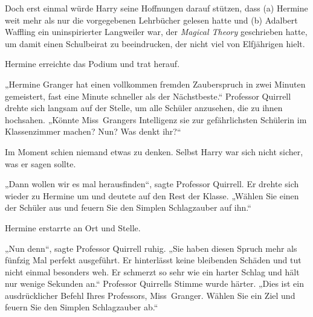 Doch erst einmal würde Harry seine Hoffnungen darauf stützen, dass (a) Hermine weit mehr als nur die vorgegebenen Lehrbücher gelesen hatte und (b) Adalbert Waffling ein uninspirierter Langweiler war, der \emph{Magical Theory} geschrieben hatte, um damit einen Schulbeirat zu beeindrucken, der nicht viel von Elfjährigen hielt.

Hermine erreichte das Podium und trat herauf.

„Hermine Granger hat einen vollkommen fremden Zauberspruch in zwei Minuten gemeistert, fast eine Minute schneller als der Nächstbeste.“ Professor Quirrell drehte sich langsam auf der Stelle, um alle Schüler anzusehen, die zu ihnen hochsahen.
„Könnte Miss~Grangers Intelligenz sie zur gefährlichsten Schülerin im Klassenzimmer machen? Nun? Was denkt ihr?“

Im Moment schien niemand etwas zu denken. Selbst Harry war sich nicht sicher, was er sagen sollte.

„Dann wollen wir es mal herausfinden“, sagte Professor Quirrell. Er drehte sich wieder zu Hermine um und deutete auf den Rest der Klasse.
„Wählen Sie einen der Schüler aus und feuern Sie den Simplen Schlagzauber auf ihn.“

Hermine erstarrte an Ort und Stelle.

„Nun denn“, sagte Professor Quirrell ruhig.
„Sie haben diesen Spruch mehr als fünfzig Mal perfekt ausgeführt. Er hinterlässt keine bleibenden Schäden und tut nicht einmal besonders weh. Er schmerzt so sehr wie ein harter Schlag und hält nur wenige Sekunden an.“ Professor Quirrells Stimme wurde härter.
„Dies ist ein ausdrücklicher Befehl Ihres Professors, Miss~Granger. Wählen Sie ein Ziel und feuern Sie den Simplen Schlagzauber ab.“

